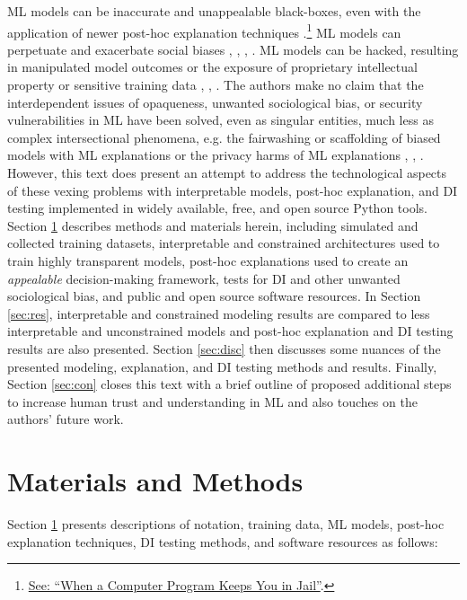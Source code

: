 \documentclass[information,article,submit,moreauthors,pdftex]{definitions/mdpi}
\begin{document}
ML models can be inaccurate and unappealable black-boxes, even with the application of newer post-hoc explanation techniques \cite{please_stop}.\footnote{\href{https://www.nytimes.com/2017/06/13/opinion/how-computers-are-harming-criminal-justice.html}{See: ``When a Computer Program Keeps You in Jail''}.} ML models can perpetuate and exacerbate social biases \cite{fairmlbook}, \cite{feldman2015certifying}, \cite{dwork2012fairness}, \cite{gender_shades}.  ML models can be hacked, resulting in manipulated model outcomes or the exposure of proprietary intellectual property or sensitive training data \cite{security_of_ml}, \cite{model_stealing}, \cite{membership_inference}. The authors make no claim that the interdependent issues of opaqueness, unwanted sociological bias, or security vulnerabilities in ML have been solved, even as singular entities, much less as complex intersectional phenomena, e.g. the fairwashing or scaffolding of biased models with ML explanations or the privacy harms of ML explanations \cite{fair_washing}, \cite{scaffolding}, \cite{shokri2019privacy}. However, this text does present an attempt to address the technological aspects of these vexing problems with interpretable models, post-hoc explanation, and DI testing implemented in widely available, free, and open source Python tools. Section \ref{sec:m_and_m} describes methods and materials herein, including simulated and collected training datasets, interpretable and constrained architectures used to train highly transparent models, post-hoc explanations used to create an \textit{appealable} decision-making framework, tests for DI and other unwanted sociological bias, and public and open source software resources. In Section \ref{sec:res}, interpretable and constrained modeling results are compared to less interpretable and unconstrained models and post-hoc explanation and DI testing results are also presented. Section \ref{sec:disc} then discusses some nuances of the presented modeling, explanation, and DI testing methods and results. Finally, Section \ref{sec:con} closes this text with a brief outline of proposed additional steps to increase human trust and understanding in ML and also touches on the authors' future work.

\section{Materials and Methods}\label{sec:m_and_m}

Section \ref{sec:m_and_m} presents descriptions of notation, training data, ML models, post-hoc explanation techniques, DI testing methods, and software resources as follows:\\
\end{document}
